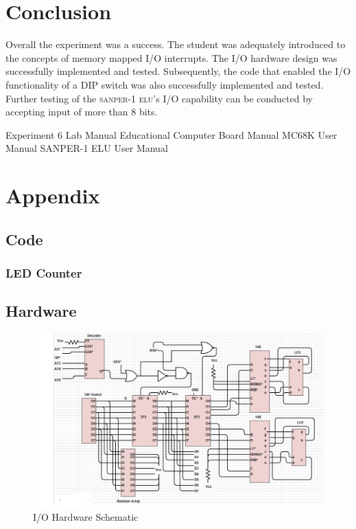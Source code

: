 \documentclass[12pt,Letter]{article}
\newcommand{\sanper}{\textsc{sanper-1 elu}}
\begin{document}
\section{Conclusion} 
Overall the experiment was a success. The student was adequately introduced to the concepts of memory mapped I/O interrupts. The I/O hardware design was successfully implemented and tested. Subsequently, the code that enabled the I/O functionality of a DIP switch was also successfully implemented and tested. Further testing of the \sanper's I/O capability can be conducted by accepting input of more than 8 bits.
\begin{thebibliography}{1}
	 Experiment 6 Lab Manual
	 Educational Computer Board Manual
	MC68K User Manual
	SANPER-1 ELU User Manual
	
	
\end{thebibliography}
  

\section{Appendix}
\label{appendix}
\subsection{Code}\label{code}
\subsubsection{LED Counter}\label{sec:memtest}

\subsection{Hardware}\label{sec:hardware}
\begin{figure}[H]
\centering
\includegraphics[width=1\linewidth]{lab6schematic}
\caption{I/O Hardware Schematic}
\label{fig:lab6schematic}
\end{figure}
\end{document}
